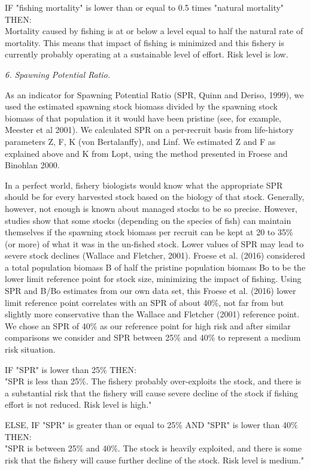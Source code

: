 IF "fishing mortality" is lower than or equal to 0.5 times "natural mortality" THEN:\\[0cm]
Mortality caused by fishing is at or below a level equal to half the natural rate of mortality. This means that impact of fishing is minimized and this fishery is currently probably operating at a sustainable level of effort. Risk level is low.

\textit{6. Spawning Potential Ratio.}

As an indicator for Spawning Potential Ratio (SPR, Quinn and Deriso, 1999), we used the estimated spawning stock biomass divided by the spawning stock biomass of that population it it would have been pristine (see, for example, Meester et al 2001). We calculated SPR on a per-recruit basis from life-history parameters Z, F, K (von Bertalanffy), and Linf. We estimated Z and F as explained above and K from Lopt, using the method presented in Froese and Binohlan 2000.

\clearpage
\newpage

In a perfect world, fishery biologists would know what the appropriate SPR should be for every harvested stock based on the biology of that stock. Generally, however, not enough is known about managed stocks to be so precise. However, studies show that some stocks (depending on the species of fish) can maintain themselves if the spawning stock biomass per recruit can be kept at 20 to 35\% (or more) of what it was in the un-fished stock. Lower values of SPR may lead to severe stock declines (Wallace and Fletcher, 2001). Froese et al. (2016) considered a total population biomass B of half the pristine population biomass Bo to be the lower limit reference point for stock size, minimizing the impact of fishing. Using SPR and B/Bo estimates from our own data set, this Froese et al. (2016) lower limit reference point correlates with an SPR of about 40\%, not far from but slightly more conservative than the Wallace and Fletcher (2001) reference point. We chose an SPR of 40\% as our reference point for high risk and after similar comparisons we consider and SPR between 25\% and 40\% to represent a medium risk situation.

IF "SPR" is lower than 25\% THEN:\\[0cm]
"SPR is less than 25\%. The fishery probably over-exploits the stock, and there is a substantial risk that the fishery will cause severe decline of the stock if fishing effort is not reduced. Risk level is high."

ELSE, IF "SPR" is greater than or equal to 25\% AND "SPR" is lower than 40\% THEN:\\[0cm]
"SPR is between 25\% and 40\%. The stock is heavily exploited, and there is some risk that the fishery will cause further decline of the stock. Risk level is medium."

